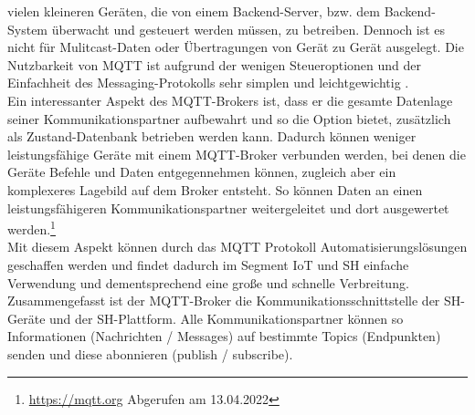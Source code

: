         vielen kleineren Geräten, die von einem Backend-Server, bzw. dem Backend-System überwacht und gesteuert werden müssen, zu 
        betreiben. Dennoch ist es nicht für Mulitcast-Daten oder Übertragungen von Gerät zu Gerät ausgelegt. Die Nutzbarkeit 
        von \acs{MQTT} ist aufgrund der wenigen Steueroptionen und der Einfachheit des Messaging-Protokolls sehr simplen und 
        leichtgewichtig \cite{Naik2017}. 
        \\
        \linebreak
        Ein interessanter Aspekt des \acs{MQTT}-Brokers ist, dass er die gesamte Datenlage seiner Kommunikationspartner aufbewahrt und 
        so die Option bietet, zusätzlich als Zustand-Datenbank betrieben werden kann. Dadurch können weniger leistungsfähige Geräte 
        mit einem \acs{MQTT}-Broker verbunden werden, bei denen die Geräte Befehle und Daten entgegennehmen können, zugleich aber ein 
        komplexeres Lagebild auf dem Broker entsteht. So können Daten an einen leistungsfähigeren Kommunikationspartner 
        weitergeleitet und dort ausgewertet werden.\footnote{\url{https://mqtt.org} Abgerufen am 13.04.2022}
        \\
        Mit diesem Aspekt können durch das \acl{MQTT} Protokoll Automatisierungslösungen geschaffen werden und findet dadurch im 
        Segment \acs{IoT} und \acl{SH} einfache Verwendung und dementsprechend eine große und schnelle Verbreitung. 
        \\
        \linebreak
        Zusammengefasst ist der \acs{MQTT}-Broker die Kommunikationsschnittstelle der \acl{SH}-Geräte und der \acl{SH}-Plattform. 
        Alle Kommunikationspartner können so Informationen (Nachrichten / Messages) auf bestimmte Topics (Endpunkten) senden und 
        diese abonnieren (publish / subscribe). 

